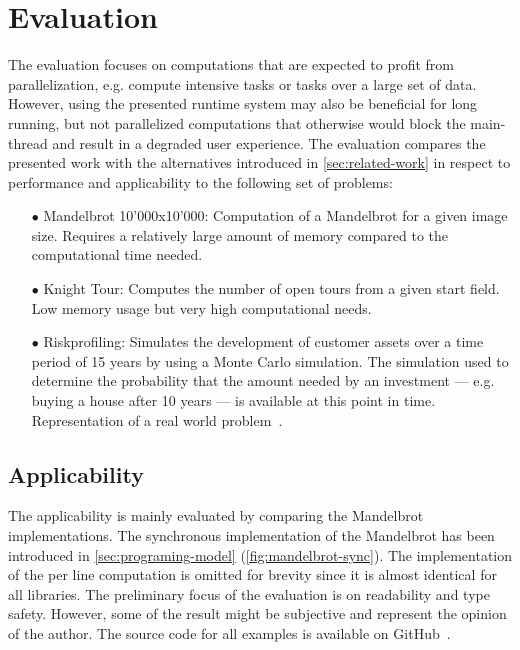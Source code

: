 \section{Evaluation}\label{sec:evaluation}
The evaluation focuses on computations that are expected to profit from parallelization, e.g. compute intensive tasks or tasks over a large set of data. However, using the presented runtime system may also be beneficial for long running, but not parallelized computations that otherwise would block the main-thread and result in a degraded user experience. The evaluation compares the presented work with the alternatives introduced in \cref{sec:related-work} in respect to performance and applicability to the following set of problems:

\begin{itemize}
	\item[$\bullet$] Mandelbrot 10'000x10'000: Computation of a Mandelbrot for a given image size. Requires a relatively large amount of memory compared to the computational time needed.
	\item[$\bullet$] Knight Tour: Computes the number of open tours from a given start field. Low memory usage but very high computational needs.
	\item[$\bullet$] Riskprofiling: Simulates the development of customer assets over a time period of 15 years by using a Monte Carlo simulation. The simulation used to determine the probability that the amount needed by an investment --- e.g. buying a house after 10 years --- is available at this point in time. Representation of a real world problem~\cite{Kwsoft2016}.
\end{itemize}


\subsection{Applicability}
The applicability is mainly evaluated by comparing the Mandelbrot implementations. The synchronous implementation of the Mandelbrot has been introduced in \cref{sec:programing-model} (\cref{fig:mandelbrot-sync}). The implementation of the per line computation is omitted for brevity since it is almost identical for all libraries. The preliminary focus of the evaluation is on readability and type safety. However, some of the result might be subjective and represent the opinion of the author. The source code for all examples is available on GitHub~\cite{Reiser2016}. 

